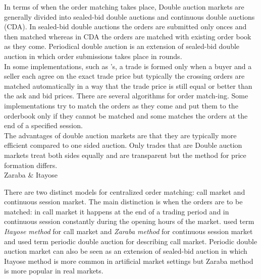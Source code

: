 

In terms of when the order matching takes place, 
Double auction markets are generally divided into sealed-bid double 
auctions and continuous double auctions (CDA). In sealed-bid double 
auctions the orders are submitted only onces and then matched 
whereas in CDA the orders are matched with existing order book
as they come. Periodical double auction is an extension of sealed-bid 
double auction in which order submissions takes place in rounds. \citep*{Moc15} \\


In some implementations, such as \citet{God93}'s, a 
trade is formed only when a buyer and a seller each agree on 
the exact trade price but typically the crossing orders are matched 
automatically in a way that the trade price is still equal or better 
than the ask and bid prices. There are several algorithms for order 
match-ing. Some implementations try to match the orders as they come 
and put them to the orderbook only if they cannot be matched and some 
matches the orders at the end of a specified session. \\

The advantages of double auction markets are that they are typically more efficient compared to one sided auction. Only trades that are
Double auction markets treat both sides equally and are transparent but the method for price formation differs.\\



Zaraba & Itayose

There are two distinct models for centralized order matching:
call market and continuous session market. The main distinction
is when the orders are to be matched: in call market it happens
at the end of a trading period and in continuous session constantly
during the opening hours of the market. \citep{boer05} \citet{ASt05} 
used term \textit{Itayose method} for call market and \textit{Zaraba method} for 
continuous session market and \citet{Moc15} used term periodic double auction
for describing call market. Periodic double auction market can also be seen as 
an extension of sealed-bid auction in which 
Itayose method
is more common in artificial market settings but Zaraba method 
is more popular in real markets. 


